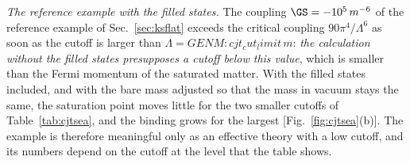 \emph{The reference example with the filled states.} The coupling $\GS=-10^{5}\,m^{-6}$ of the
reference example of Sec.~\ref{sec:ksflat} exceeds the critical coupling $90\pi^{4}/\Lambda^{6}$ as
soon as the cutoff is larger than $\Lambda={{GENM:cjt_cut_limit}}\,m$: \emph{the calculation without
the filled states presupposes a cutoff below this value}, which is smaller than the Fermi momentum
of the saturated matter. With the filled states included, and with the bare mass adjusted so that
the mass in vacuum stays the same, the saturation point moves little for the two smaller cutoffs of
Table~\ref{tab:cjtsea}, and the binding grows for the largest [Fig.~\ref{fig:cjtsea}(b)]. The example is therefore meaningful only as an
effective theory with a low cutoff, and its numbers depend on the cutoff at the level that the table
shows.

